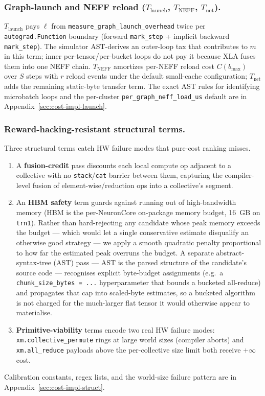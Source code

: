 \subsubsection{Graph-launch and NEFF reload ($T_{\text{launch}}$,
$T_{\text{NEFF}}$, $T_{\text{net}}$).}
$T_{\text{launch}}$ pays $\ell$ from
\texttt{measure\_graph\_launch\_overhead} twice per
\texttt{autograd.Function} boundary (forward \texttt{mark\_step} +
implicit backward \texttt{mark\_step}). The simulator AST-derives
an outer-loop tax that contributes to $m$ in this term; inner
per-tensor/per-bucket loops do not pay it because XLA fuses them
into one NEFF chain. $T_{\text{NEFF}}$ amortizes per-NEFF reload
cost $C(b_{\max})$ over $S$ steps with $r$ reload events under the
default small-cache configuration; $T_{\text{net}}$ adds the
remaining static-byte transfer term. The exact AST rules for
identifying microbatch loops and the per-cluster
\texttt{per\_graph\_neff\_load\_us} default are in
Appendix~\ref{sec:cost-impl-launch}.

\subsubsection{Reward-hacking-resistant structural terms.}
Three structural terms catch HW failure modes that pure-cost
ranking misses.
\begin{enumerate}[leftmargin=*,topsep=2pt,itemsep=2pt]
\item A \textbf{fusion-credit} pass discounts each local compute op
adjacent to a collective with no \texttt{stack}/\texttt{cat}
barrier between them, capturing the compiler-level fusion of
element-wise/reduction ops into a collective's segment.
\item An \textbf{HBM safety} term guards against running out of
high-bandwidth memory (HBM is the per-NeuronCore on-package memory
budget, 16~GB on \texttt{trn1}). Rather than hard-rejecting any
candidate whose peak memory exceeds the budget --- which would let
a single conservative estimate disqualify an otherwise good
strategy --- we apply a smooth quadratic penalty proportional
to how far the estimated peak overruns the budget. A separate
abstract-syntax-tree (AST) pass --- AST is the parsed structure of
the candidate's source code --- recognises explicit byte-budget
assignments (e.g.\ a \texttt{chunk\_size\_bytes = ...} hyperparameter
that bounds a bucketed all-reduce) and propagates that cap into
scaled-byte estimates, so a bucketed algorithm is not charged for
the much-larger flat tensor it would otherwise appear to
materialise.
\item \textbf{Primitive-viability} terms encode two real HW
failure modes: \texttt{xm.collective\_permute} rings at large
world sizes (compiler aborts) and \texttt{xm.all\_reduce} payloads
above the per-collective size limit both receive $+\infty$ cost.
\end{enumerate}
Calibration constants, regex lists, and the world-size failure
pattern are in Appendix~\ref{sec:cost-impl-struct}.

